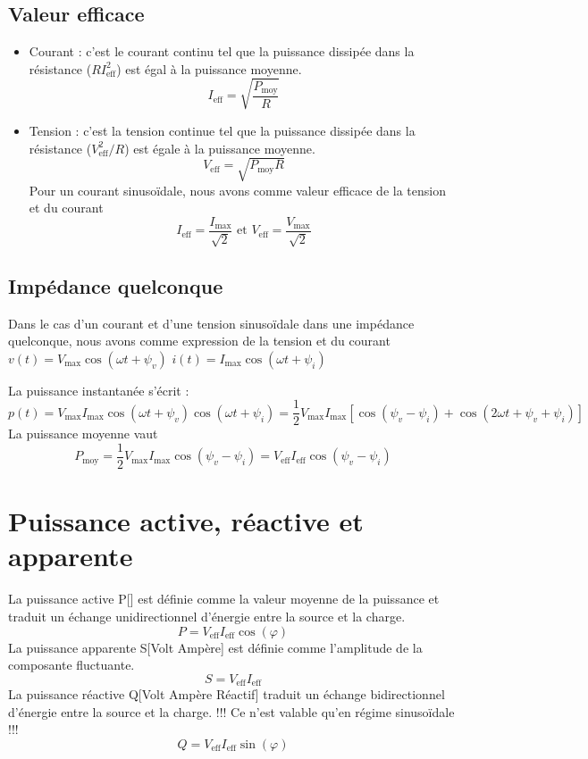 \subsection{Valeur efficace}
\begin{itemize}
\item Courant : c'est le courant continu tel que la puissance dissipée dans la résistance ($RI_\text{eff}^2$) est égal à la puissance moyenne.
\begin{equation}
I_\text{eff}=\sqrt{\frac{P_\text{moy}}{R}}
\end{equation}
\item Tension : c'est la tension continue tel que la puissance dissipée dans la résistance ($V_\text{eff}^2/R$) est égale à la puissance moyenne.
\begin{equation}
V_\text{eff}=\sqrt{P_\text{moy} R}
\end{equation}
Pour un courant sinusoïdale, nous avons comme valeur efficace de la tension et du courant
$$ I_\text{eff}=\frac{I_\text{max}}{\sqrt{2}} \text{ et }  V_\text{eff}=\frac{V_\text{max}}{\sqrt{2}} $$
\end{itemize}
\subsection{Impédance quelconque}
Dans le cas d'un courant et d'une tension sinusoïdale dans une impédance quelconque, nous avons comme expression de la tension et du courant \newline
$v(t) = V_\text{max} \cos (\omega t + \psi_v)$\newline
$i(t) = I_\text{max} \cos (\omega t + \psi_i)$

La puissance instantanée s'écrit : 
$$p(t) = V_\text{max}I_\text{max} \cos (\omega t + \psi_v) \cos (\omega t + \psi_i) = \frac{1}{2}V_\text{max}I_\text{max} \left[\cos (\psi_v-\psi_i) + \cos(2\omega t + \psi_v + \psi_i)\right]$$
La puissance moyenne vaut
$$P_\text{moy}=\frac{1}{2}V_\text{max}I_\text{max} \cos (\psi_v-\psi_i) = V_\text{eff}I_\text{eff} \cos (\psi_v-\psi_i)$$
\section{Puissance active, réactive et apparente}
La puissance active \unit{P}{[\watt]} est définie comme la valeur moyenne de la puissance et traduit un échange unidirectionnel d'énergie entre la source et la charge.
\begin{equation}
P=V_\text{eff}I_\text{eff}\cos(\varphi)
\end{equation}
La puissance apparente \unit{S}{[Volt Ampère]} est définie comme l'amplitude de la composante fluctuante.
\begin{equation}
S=V_\text{eff}I_\text{eff}
\end{equation}
La puissance réactive \unit{Q}{[Volt Ampère Réactif]} traduit un échange bidirectionnel d'énergie entre la source et la charge. !!! Ce n'est valable qu'en régime sinusoïdale !!!
\begin{equation}
Q=V_\text{eff}I_\text{eff}\sin(\varphi)
\end{equation}

